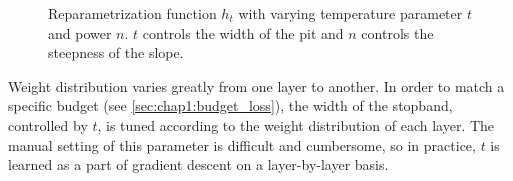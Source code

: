 \begin{figure}
    \centering
      \caption{\centering
    Reparametrization function $h_t$ with varying temperature parameter $t$ and
    power $n$. $t$ controls the width of the pit and $n$ controls the steepness
    of the slope.}
    \label{fig:stopband}
\end{figure}

Weight distribution varies greatly from one layer to another. In order to match
a specific budget (see \cref{sec:chap1:budget_loss}), the width of the stopband,
controlled by $t$, is tuned according to the weight distribution of each layer.
The manual setting of this parameter is difficult and cumbersome, so in
practice, $t$ is learned as a part of gradient descent on a layer-by-layer
basis.\\



